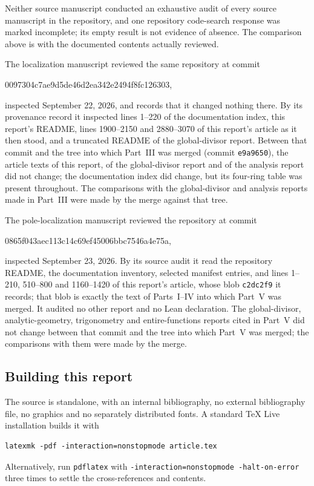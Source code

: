 \documentclass[11pt,letterpaper]{article}
\theoremstyle{definition}
\theoremstyle{remark}
\numberwithin{equation}{section}
\begin{document}
Neither source manuscript conducted an exhaustive audit of every source
manuscript in the repository, and one repository code-search response was
marked incomplete; its empty result is not evidence of absence. The comparison
above is with the documented contents actually reviewed.

The localization manuscript reviewed the same repository at commit
\begin{center}\small\ttfamily
0097304c7ae9d5de46d2ea342e2494f8fc126303,
\end{center}
inspected September 22, 2026, and records that it changed nothing there. By its provenance record it inspected
lines 1--220 of the documentation index, this report's README, lines
1900--2150 and 2880--3070 of this report's article as it then stood, and a
truncated README of the global-divisor report. Between that commit and the
tree into which Part~III was merged (commit
\texttt{e9a9650}), the article texts of this report, of the global-divisor
report and of the analysis report did not change; the documentation index did
change, but its four-ring table was present throughout. The comparisons with
the global-divisor and analysis reports made in Part~III were made by the
merge against that tree.

The pole-localization manuscript reviewed the repository at commit
\begin{center}\small\ttfamily
0865f043aec113c14c69ef45006bbc7546a4e75a,
\end{center}
inspected September 23, 2026. By its source audit it read the repository
README, the documentation inventory, selected manifest entries, and lines
1--210, 510--800 and 1160--1420 of this report's article, whose blob
\texttt{c2dc2f9} it records; that blob is exactly the text of Parts~I--IV into
which Part~V was merged. It audited no other report and no Lean declaration.
The global-divisor, analytic-geometry, trigonometry and entire-functions
reports cited in Part~V did not change between that commit and the tree into
which Part~V was merged; the comparisons with them were made by the merge.

\subsection{Building this report}

The source is standalone, with an internal bibliography, no external
bibliography file, no graphics and no separately distributed fonts. A standard
TeX Live installation builds it with
\begin{verbatim}
latexmk -pdf -interaction=nonstopmode article.tex
\end{verbatim}
Alternatively, run \texttt{pdflatex} with
\texttt{-interaction=nonstopmode -halt-on-error} three times to settle the
cross-references and contents.
\end{document}

